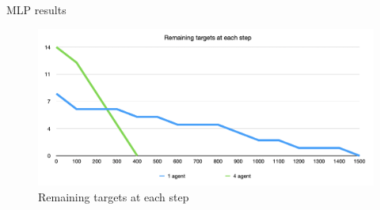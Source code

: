 \documentclass[presentation]{beamer}\mode<presentation>{\usetheme{AMSBolognaFC}}
\begin{document}
\begin{frame}[allowframebreaks]{MLP results}
	\begin{figure}
		\includegraphics[width=\textwidth]{img/active-targets-per-step.png}
		\caption{Remaining targets at each step}
		\label{fig:o}
		\end{figure}
\end{frame}


\section*{}

\frame{\titlepage}

\section*{\refname}

\begin{frame}{\refname}
	\tiny
	\nocite{*}
	\printbibliography
\end{frame}

\end{document}
